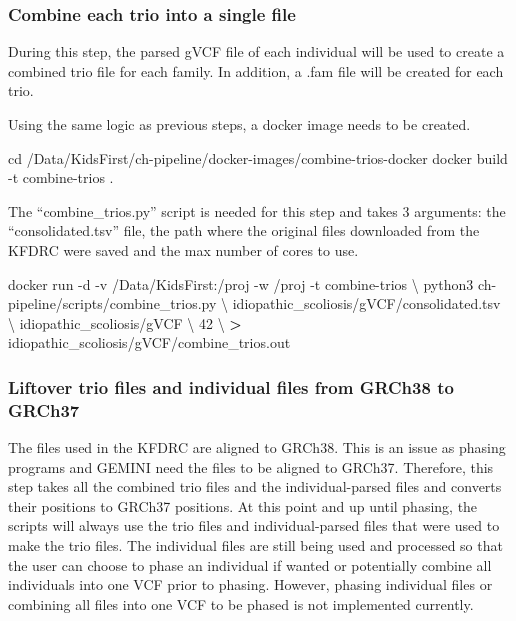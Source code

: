 \documentclass[]{article}
\newenvironment{Shaded}{\begin{snugshade}}{\end{snugshade}}
\newcommand{\BuiltInTok}[1]{#1}
\newcommand{\ExtensionTok}[1]{#1}
\newcommand{\NormalTok}[1]{#1}
\newcommand{\OperatorTok}[1]{\textcolor[rgb]{0.81,0.36,0.00}{\textbf{#1}}}
\begin{document}
\hypertarget{combine-each-trio-into-a-single-file}{%
\subsubsection{Combine each trio into a single
file}\label{combine-each-trio-into-a-single-file}}

During this step, the parsed gVCF file of each individual will be used
to create a combined trio file for each family. In addition, a .fam file
will be created for each trio.

Using the same logic as previous steps, a docker image needs to be
created.

\begin{Shaded}
\begin{Highlighting}[]
\BuiltInTok{cd}\NormalTok{ /Data/KidsFirst/ch-pipeline/docker-images/combine-trios-docker}
\ExtensionTok{docker}\NormalTok{ build -t combine-trios .}
\end{Highlighting}
\end{Shaded}

The ``combine\_trios.py'' script is needed for this step and takes 3
arguments: the ``consolidated.tsv'' file, the path where the original
files downloaded from the KFDRC were saved and the max number of cores
to use.

\begin{Shaded}
\begin{Highlighting}[]
\ExtensionTok{docker}\NormalTok{ run -d -v /Data/KidsFirst:/proj -w /proj -t combine-trios \textbackslash{}}
\NormalTok{  python3 ch-pipeline/scripts/combine_trios.py \textbackslash{}}
\NormalTok{  idiopathic_scoliosis/gVCF/consolidated.tsv \textbackslash{}}
\NormalTok{  idiopathic_scoliosis/gVCF \textbackslash{}}
\NormalTok{  42 \textbackslash{}}
  \OperatorTok{>}\NormalTok{ idiopathic_scoliosis/gVCF/combine_trios.out}
\end{Highlighting}
\end{Shaded}

\hypertarget{liftover-trio-files-and-individual-files-from-grch38-to-grch37}{%
\subsubsection{Liftover trio files and individual files from GRCh38 to
GRCh37}\label{liftover-trio-files-and-individual-files-from-grch38-to-grch37}}

The files used in the KFDRC are aligned to GRCh38. This is an issue as
phasing programs and GEMINI need the files to be aligned to GRCh37.
Therefore, this step takes all the combined trio files and the
individual-parsed files and converts their positions to GRCh37
positions. At this point and up until phasing, the scripts will always
use the trio files and individual-parsed files that were used to make
the trio files. The individual files are still being used and processed
so that the user can choose to phase an individual if wanted or
potentially combine all individuals into one VCF prior to phasing.
However, phasing individual files or combining all files into one VCF to
be phased is not implemented currently.
\end{document}
